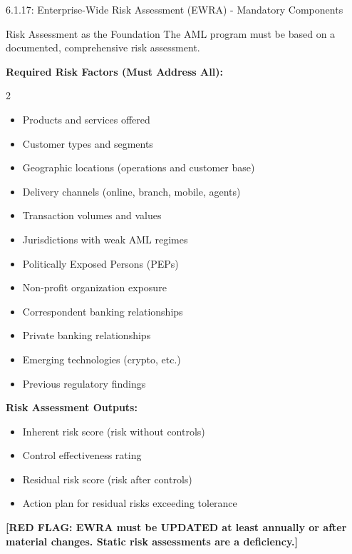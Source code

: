\documentclass[11pt,a4paper]{beamer}
\newcommand{\redflag}[1]{\textcolor{red!80!black}{\textbf{[RED FLAG: #1]}}}
\begin{document}
\begin{frame}{6.1.17: Enterprise-Wide Risk Assessment (EWRA) - Mandatory Components}
	\begin{block}{Risk Assessment as the Foundation}
		The AML program must be based on a documented, comprehensive risk assessment.
	\end{block}
	\textbf{Required Risk Factors (Must Address All):}
	\begin{multicols}{2}
		\begin{itemize}
			\item Products and services offered
			\item Customer types and segments
			\item Geographic locations (operations and customer base)
			\item Delivery channels (online, branch, mobile, agents)
			\item Transaction volumes and values
			\item Jurisdictions with weak AML regimes
			\item Politically Exposed Persons (PEPs)
			\item Non-profit organization exposure
			\item Correspondent banking relationships
			\item Private banking relationships
			\item Emerging technologies (crypto, etc.)
			\item Previous regulatory findings
		\end{itemize}
	\end{multicols}
	\textbf{Risk Assessment Outputs:}
	\begin{itemize}
		\item Inherent risk score (risk without controls)
		\item Control effectiveness rating
		\item Residual risk score (risk after controls)
		\item Action plan for residual risks exceeding tolerance
	\end{itemize}
	\redflag{EWRA must be UPDATED at least annually or after material changes. Static risk assessments are a deficiency.}
\end{frame}
\end{document}

